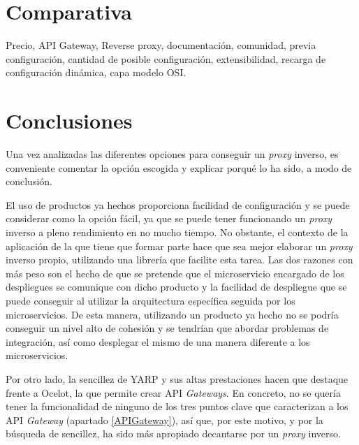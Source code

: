 \documentclass[11pt,spanish,listoffigures]{tfgetsinf}
\begin{document}

	\section{Comparativa}

Precio, API Gateway, Reverse proxy, documentación, comunidad, previa configuración, cantidad de posible configuración, extensibilidad, recarga de configuración dinámica, capa modelo OSI.


	\section{Conclusiones}

Una vez analizadas las diferentes opciones para conseguir un \emph{proxy} inverso, es conveniente comentar la opción escogida y explicar porqué lo ha sido, a modo de conclusión.

El uso de productos ya hechos proporciona facilidad de configuración y se puede considerar como la opción fácil, ya que se puede tener funcionando un \emph{proxy} inverso a pleno rendimiento en no mucho tiempo. No obstante, el contexto de la aplicación de la que tiene que formar parte hace que sea mejor elaborar un \emph{proxy} inverso propio, utilizando una librería que facilite esta tarea. Las dos razones con más peso son el hecho de que se pretende que el microservicio encargado de los despliegues se comunique con dicho producto y la facilidad de despliegue que se puede conseguir al utilizar la arquitectura específica seguida por los microservicios. De esta manera, utilizando un producto ya hecho no se podría conseguir un nivel alto de cohesión y se tendrían que abordar problemas de integración, así como desplegar el mismo de una manera diferente a los microservicios.

Por otro lado, la sencillez de YARP y sus altas prestaciones hacen que destaque frente a Ocelot, la que permite crear API \emph{Gateways}. En concreto, no se quería tener la funcionalidad de ninguno de los tres puntos clave que caracterizan a los API \emph{Gateway} (apartado \ref{APIGateway}), así que, por este motivo, y por la búsqueda de sencillez, ha sido más apropiado decantarse por un \emph{proxy} inverso.

\end{document}
